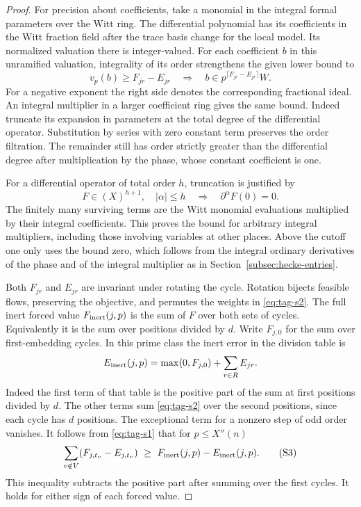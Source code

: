 \begin{proof}
For precision about coefficients, take a monomial in the integral
formal parameters over the Witt ring. The differential polynomial
has its coefficients in the Witt fraction field after the trace
basis change for the local model. Its normalized valuation there
is integer-valued. For each coefficient \(b\) in this unramified valuation, integrality of its order strengthens the given lower bound to
\[
  v_p(b)\ge F_{jr}-E_{jr}\quad\Longrightarrow\quad b\in p^{\lceil F_{jr}-E_{jr}\rceil}W.
\]
For a negative exponent the right side denotes the corresponding fractional ideal. An integral multiplier in a larger coefficient
ring gives the same bound. Indeed truncate its expansion in
parameters at the total degree of the differential operator.
Substitution by series with zero constant term preserves the
order filtration. The remainder still has order strictly greater
than the differential degree after multiplication by the phase,
whose constant coefficient is one.

For a differential operator of total order \(h\), truncation is justified by
\[
  F\in (X)^{h+1},\quad |\alpha|\le h\quad\Longrightarrow\quad \partial^\alpha F(0)=0 .
\]
 The finitely many surviving
terms are the Witt monomial evaluations multiplied by their
integral coefficients. This proves the bound for arbitrary
integral multipliers, including those involving variables at
other places. Above the cutoff one only uses the bound zero,
which follows from the integral ordinary derivatives of the
phase and of the integral multiplier as in
Section~\ref{subsec:hecke-entries}.

Both \(F_{jr}\) and \(E_{jr}\) are invariant under rotating the
cycle. Rotation bijects feasible flows, preserving the objective,
and permutes the weights in \eqref{eq:tag-s2}. The full inert forced value
\(F_{\rm inert}(j,p)\) is the sum of \(F\) over both sets of
cycles. Equivalently it is the sum over positions divided by \(d\).
Write \(F_{j,0}\) for the sum over first-embedding cycles. In this
prime class the inert error in the division table is
\[
 E_{\rm inert}(j,p)=\max(0,F_{j,0})+\sum_{r\in R}E_{jr}.
\]
Indeed the first term of that table is the positive part of the
sum at first positions divided by \(d\). The other terms sum
\eqref{eq:tag-s2} over the second positions, since each cycle has \(d\)
positions. The exceptional term for a nonzero step of odd order
vanishes. It follows from \eqref{eq:tag-s1} that for \(p\le X''(n)\)
\[
 \sum_{v\notin V}(F_{j,t_v}-E_{j,t_v})
 \ \ge\ F_{\rm inert}(j,p)-E_{\rm inert}(j,p).
 \tag{S3}\label{eq:tag-s3}
\]
This inequality subtracts the positive part after summing over
the first cycles. It holds for either sign of each forced value.


\end{proof}
